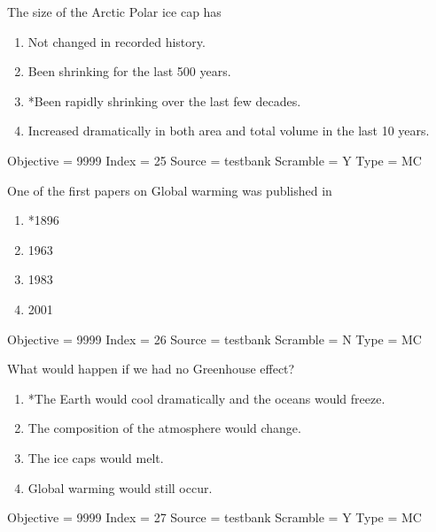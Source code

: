 \documentclass[11pt]{article}
\begin{document}
\begin{enumerate}
\begin{minipage}{\textwidth}
\begin{minipage}{\textwidth}
\item The size of the Arctic Polar ice cap has
\begin{enumerate} 
\setlength{\itemsep}{1pt} 
\setlength{\parskip}{0pt} 
\setlength{\parsep}{0pt}
\setlength{\multicolsep}{1pt} 
\item Not changed in recorded history.
\item Been shrinking for the last 500 years.
\item *Been rapidly shrinking over the last few decades.
\item Increased dramatically in both area and total volume in the last 10 years.
\end{enumerate} 
Objective = 9999
Index = 25
Source = testbank
Scramble = Y
Type = MC
\end{minipage}
\end{minipage}
\vskip 0.20in

\begin{minipage}{\textwidth}
\begin{minipage}{\textwidth}
\item One of the first papers on Global warming was published in
\begin{multicols}{3}
\begin{enumerate} 
\setlength{\itemsep}{1pt} 
\setlength{\parskip}{0pt} 
\setlength{\parsep}{0pt}
\setlength{\multicolsep}{1pt} 
\item *1896
\item 1963
\item 1983
\item 2001
\end{enumerate} 
\vfill 
\end{multicols}

Objective = 9999
Index = 26
Source = testbank
Scramble = N
Type = MC
\end{minipage}
\end{minipage}
\vskip 0.20in

\begin{minipage}{\textwidth}
\begin{minipage}{\textwidth}
\item What would happen if we had no Greenhouse effect?
\begin{enumerate} 
\setlength{\itemsep}{1pt} 
\setlength{\parskip}{0pt} 
\setlength{\parsep}{0pt}
\setlength{\multicolsep}{1pt} 
\item *The Earth would cool dramatically and the oceans would freeze.
\item The composition of the atmosphere would change.
\item The ice caps would melt.
\item Global warming would still occur.
\end{enumerate} 
Objective = 9999
Index = 27
Source = testbank
Scramble = Y
Type = MC
\end{minipage}
\end{minipage}
\vskip 0.20in


\end{enumerate}
\end{document}
